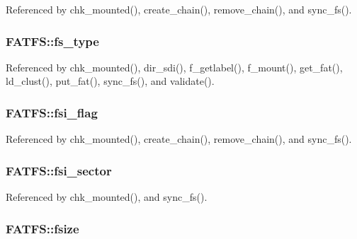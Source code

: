 Referenced by chk\-\_\-mounted(), create\-\_\-chain(), remove\-\_\-chain(), and sync\-\_\-fs().

\hypertarget{structFATFS_add27d97babe807b573eac98a71dc4ae5}{
\subsubsection[{fs\-\_\-type}]{ F\-A\-T\-F\-S\-::fs\-\_\-type}}\label{structFATFS_add27d97babe807b573eac98a71dc4ae5}


Referenced by chk\-\_\-mounted(), dir\-\_\-sdi(), f\-\_\-getlabel(), f\-\_\-mount(), get\-\_\-fat(), ld\-\_\-clust(), put\-\_\-fat(), sync\-\_\-fs(), and validate().

\hypertarget{structFATFS_a84e9cdc5a6a8e33ea7ec192058abf161}{
\subsubsection[{fsi\-\_\-flag}]{ F\-A\-T\-F\-S\-::fsi\-\_\-flag}}\label{structFATFS_a84e9cdc5a6a8e33ea7ec192058abf161}


Referenced by chk\-\_\-mounted(), create\-\_\-chain(), remove\-\_\-chain(), and sync\-\_\-fs().

\hypertarget{structFATFS_a4900e785d26dfed6e456ceeb59ec29a7}{
\subsubsection[{fsi\-\_\-sector}]{ F\-A\-T\-F\-S\-::fsi\-\_\-sector}}\label{structFATFS_a4900e785d26dfed6e456ceeb59ec29a7}


Referenced by chk\-\_\-mounted(), and sync\-\_\-fs().

\hypertarget{structFATFS_a53e9560659f14e66f306c2c444198bf3}{
\subsubsection[{fsize}]{ F\-A\-T\-F\-S\-::fsize}}\label{structFATFS_a53e9560659f14e66f306c2c444198bf3}



